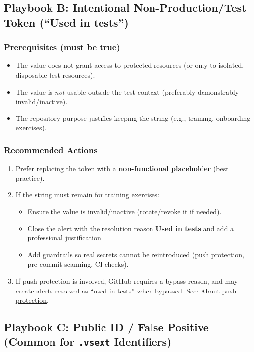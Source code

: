 \documentclass[11pt]{article}
\providecommand{\term}[1]{\textbf{#1}}
\newcommand{\codeinline}[1]{\texttt{#1}}
\begin{document}
\subsection{Playbook B: Intentional Non-Production/Test Token (``Used in tests'')}
\subsubsection{Prerequisites (must be true)}
\begin{itemize}
  \item The value does not grant access to protected resources (or only to isolated, disposable test resources).
  \item The value is \emph{not} usable outside the test context (preferably demonstrably invalid/inactive).
  \item The repository purpose justifies keeping the string (e.g., training, onboarding exercises).
\end{itemize}

\subsubsection{Recommended Actions}
\begin{enumerate}
  \item Prefer replacing the token with a \textbf{non-functional placeholder} (best practice).
  \item If the string must remain for training exercises:
  \begin{itemize}
    \item Ensure the value is invalid/inactive (rotate/revoke it if needed).
    \item Close the alert with the resolution reason \term{Used in tests} and add a professional justification.
    \item Add guardrails so real secrets cannot be reintroduced (push protection, pre-commit scanning, CI checks).
  \end{itemize}
  \item If push protection is involved, GitHub requires a bypass reason, and may create alerts resolved as ``used in tests'' when bypassed. See: \href{https://docs.github.com/en/code-security/concepts/secret-security/about-push-protection}{About push protection}.
\end{enumerate}

\subsection{Playbook C: Public ID / False Positive (Common for \codeinline{.vsext} Identifiers)}
\end{document}
